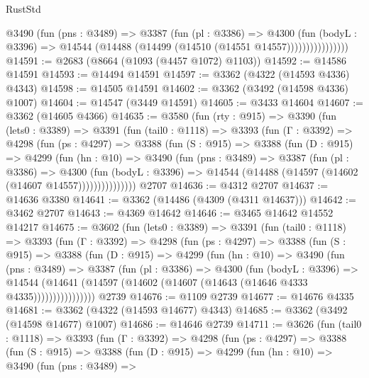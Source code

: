 \begin{lexlean}{RustStd}
\begin{coremodule}
                    @3490
                      (fun (pns : @3489) =>
                      @3387
                        (fun (pl : @3386) =>
                        @4300
                          (fun (bodyL : @3396) =>
                          @14544 (@14488 (@14499 (@14510 (@14551 @14557))))))))))))))))
@14591 := @2683 (@8664 (@1093 (@4457 @1072) @1103))
@14592 := @14586 @14591
@14593 := @14494 @14591
@14597 := @3362 (@4322 (@14593 @4336) @4343)
@14598 := @14505 @14591
@14602 := @3362 (@3492 (@14598 @4336) @1007)
@14604 := @14547 (@3449 @14591)
@14605 := @3433 @14604
@14607 := @3362 (@14605 @4366)
@14635 := @3580
    (fun (rty : @915) =>
    @3390
      (fun (lets0 : @3389) =>
      @3391
        (fun (tail0 : @1118) =>
        @3393
          (fun (Γ : @3392) =>
          @4298
            (fun (ps : @4297) =>
            @3388
              (fun (S : @915) =>
              @3388
                (fun (D : @915) =>
                @4299
                  (fun (hn : @10) =>
                  @3490
                    (fun (pns : @3489) =>
                    @3387
                      (fun (pl : @3386) =>
                      @4300
                        (fun (bodyL : @3396) =>
                        @14544 (@14488 (@14597 (@14602 (@14607 @14557)))))))))))))))
    @2707
@14636 := @4312 @2707
@14637 := @14636 @3380
@14641 := @3362 (@14486 (@4309 (@4311 @14637)))
@14642 := @3462 @2707
@14643 := @4369 @14642
@14646 := @3465 @14642 @14552 @14217
@14675 := @3602
    (fun (lets0 : @3389) =>
    @3391
      (fun (tail0 : @1118) =>
      @3393
        (fun (Γ : @3392) =>
        @4298
          (fun (ps : @4297) =>
          @3388
            (fun (S : @915) =>
            @3388
              (fun (D : @915) =>
              @4299
                (fun (hn : @10) =>
                @3490
                  (fun (pns : @3489) =>
                  @3387
                    (fun (pl : @3386) =>
                    @4300
                      (fun (bodyL : @3396) =>
                      @14544
                        (@14641 (@14597 (@14602 (@14607 (@14643 (@14646 @4333 @4335))))))))))))))))
    @2739
@14676 := @1109 @2739
@14677 := @14676 @4335
@14681 := @3362 (@4322 (@14593 @14677) @4343)
@14685 := @3362 (@3492 (@14598 @14677) @1007)
@14686 := @14646 @2739
@14711 := @3626
    (fun (tail0 : @1118) =>
    @3393
      (fun (Γ : @3392) =>
      @4298
        (fun (ps : @4297) =>
        @3388
          (fun (S : @915) =>
          @3388
            (fun (D : @915) =>
            @4299
              (fun (hn : @10) =>
              @3490
                (fun (pns : @3489) =>

\end{coremodule}
\end{lexlean}
